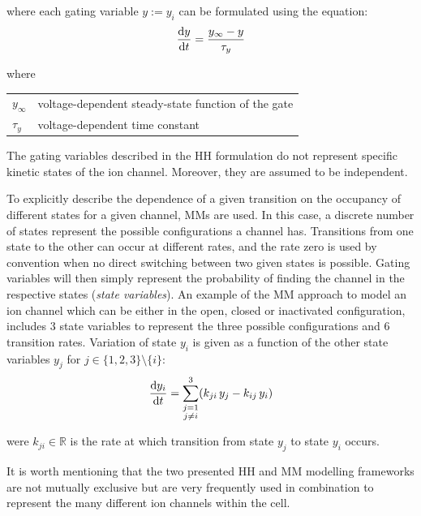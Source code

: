 \noindent
where each gating variable $y:=y_i$ can be formulated using the equation:
%
\begin{equation}
    \dfrac{\mathrm{d}{y}}{\mathrm{d}{t}} = \frac{y_{\infty}-y}{\tau_y}
\end{equation}

\noindent
where

\vspace{0.2cm}
\begin{tabular}{ll}
$y_{\infty}$ & voltage-dependent steady-state function of the gate \\
$\tau_{y}$ & voltage-dependent time constant
\end{tabular}

\vspace{0.2cm}\noindent
The gating variables described in the HH formulation do not represent specific kinetic states of the ion channel. Moreover, they are assumed to be independent.

\vspace{0.2cm}
To explicitly describe the dependence of a given transition on the occupancy of different states for a given channel, MMs are used. In this case, a discrete number of states represent the possible configurations a channel has. Transitions from one state to the other can occur at different rates, and the rate zero is used by convention when no direct switching between two given states is possible. Gating variables will then simply represent the probability of finding the channel in the respective states (\textit{state variables}). An example of the MM approach to model an ion channel which can be either in the open, closed or inactivated configuration, includes $3$ state variables to represent the three possible configurations and $6$ transition rates. Variation of state $y_i$ is given as a function of the other state variables $y_j$ for $j\in\{1,2,3\}\setminus{\{i\}}$:
%
\begin{equation}
    \dfrac{\mathrm{d}{y_i}}{\mathrm{d}{t}} = \sum_{\substack{j=1 \\ j\neq i}}^{3} (k_{ji}\,y_j-k_{ij}\,y_i)
\end{equation}

\noindent
were $k_{ji}\in\mathbb{R}$ is the rate at which transition from state $y_j$ to state $y_i$ occurs.

\vspace{0.2cm}
It is worth mentioning that the two presented HH and MM modelling frameworks are not mutually exclusive but are very frequently used in combination to represent the many different ion channels within the cell.


